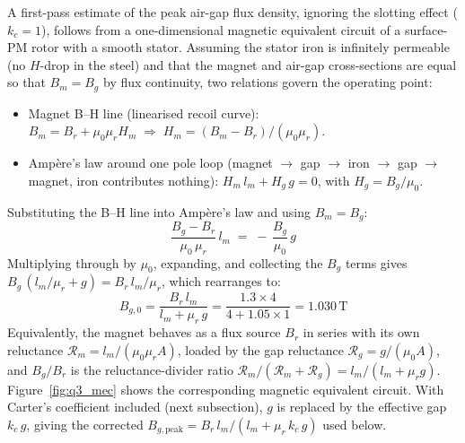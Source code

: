 \documentclass[12pt,a4paper]{article}
\newcommand{\unit}[1]{\ensuremath{\,\mathrm{#1}}}
\begin{document}
A first-pass estimate of the peak air-gap flux density, ignoring the
slotting effect ($k_c = 1$), follows from a one-dimensional magnetic
equivalent circuit of a surface-PM rotor with a smooth stator.
Assuming the stator iron is infinitely permeable (no $H$-drop in the
steel) and that the magnet and air-gap cross-sections are equal so that
$B_m = B_g$ by flux continuity, two relations govern the operating point:
\begin{itemize}[noitemsep]
  \item Magnet B--H line (linearised recoil curve):
        $B_m = B_r + \mu_0 \mu_r H_m
         \;\Longrightarrow\;
         H_m = (B_m - B_r)/(\mu_0 \mu_r)$.
  \item Amp\`ere's law around one pole loop
        (magnet $\to$ gap $\to$ iron $\to$ gap $\to$ magnet, iron
        contributes nothing):
        $H_m\, l_m + H_g\, g = 0$, with $H_g = B_g/\mu_0$.
\end{itemize}
Substituting the B--H line into Amp\`ere's law and using $B_m = B_g$:
\begin{equation}
  \frac{B_g - B_r}{\mu_0\,\mu_r}\,l_m
  \;=\; -\,\frac{B_g}{\mu_0}\,g
\end{equation}
Multiplying through by $\mu_0$, expanding, and collecting the $B_g$
terms gives
$B_g\,(l_m/\mu_r + g) = B_r\,l_m/\mu_r$, which rearranges to:
\begin{equation}
  B_{g,0} = \frac{B_r\,l_m}{l_m + \mu_r\,g}
          = \frac{1.3 \times 4}{4 + 1.05 \times 1} = 1.030\unit{T}
\end{equation}
Equivalently, the magnet behaves as a flux source $B_r$ in series with
its own reluctance $\mathcal{R}_m = l_m/(\mu_0\mu_r A)$, loaded by the
gap reluctance $\mathcal{R}_g = g/(\mu_0 A)$, and $B_g/B_r$ is the
reluctance-divider ratio $\mathcal{R}_m/(\mathcal{R}_m + \mathcal{R}_g)
= l_m/(l_m + \mu_r g)$.
Figure~\ref{fig:q3_mec} shows the corresponding magnetic equivalent
circuit.
With Carter's coefficient included (next subsection), $g$ is replaced
by the effective gap $k_c\,g$, giving the corrected
$B_{g,\text{peak}} = B_r\,l_m / (l_m + \mu_r\,k_c\,g)$ used below.
\end{document}
